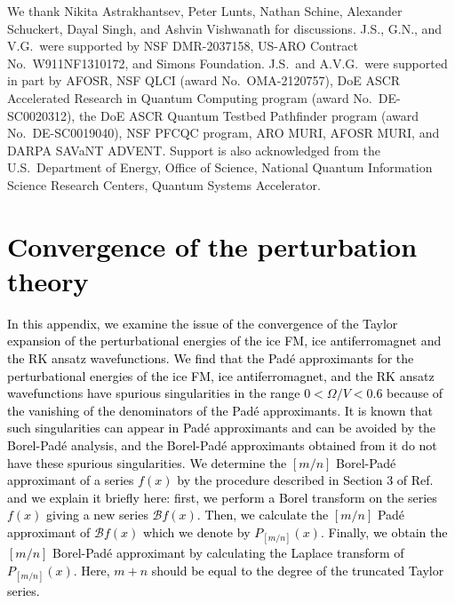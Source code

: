 \documentclass[twocolumn,superscriptaddress,amsmath,amssymb,aps,prx,nofootinbib]{revtex4-2}
\newcommand{\newtext}[1]{\textcolor{black}{#1}}
\begin{document}
\begin{acknowledgments}
We thank Nikita Astrakhantsev, Peter Lunts, Nathan Schine, Alexander Schuckert, Dayal Singh, and Ashvin Vishwanath for discussions. J.S., G.N., and V.G.~were  supported by NSF DMR-2037158, US-ARO Contract No.~W911NF1310172, and Simons Foundation. J.S.~and A.V.G.~were supported in part by AFOSR, NSF QLCI (award No.~OMA-2120757), DoE ASCR Accelerated Research in Quantum Computing program (award No.~DE-SC0020312), the DoE ASCR Quantum Testbed Pathfinder program (award No.~DE-SC0019040), NSF PFCQC program, ARO MURI, AFOSR MURI, and DARPA SAVaNT ADVENT. Support is also acknowledged from the U.S.~Department of Energy, Office of Science, National Quantum Information Science Research Centers, Quantum Systems Accelerator.  

\end{acknowledgments}



\appendix

\section{\newtext{Convergence of the perturbation theory}}\label{app:perturbation}

\newtext{In this appendix, we examine the issue of the convergence of the Taylor expansion of the perturbational energies of the ice FM, ice antiferromagnet and the RK ansatz wavefunctions. 
We find that the Pad\'e approximants for the perturbational energies of the ice FM, ice antiferromagnet, and the RK ansatz wavefunctions  have spurious singularities in the range $0 < \Omega/V < 0.6$ because of the vanishing of the denominators of the Pad\'e approximants. 
It is known that such singularities can appear in Pad\'e approximants and can be avoided by the Borel-Pad\'e analysis, and the Borel-Pad\'e approximants obtained from it do not have these spurious singularities. 
We determine the $[m/n]$ Borel-Pad\'e approximant of a series $f(x)$ by the procedure described in Section 3 of Ref.~\cite{deeb2016comparison} and we explain it briefly here: first, we perform a Borel transform on the series $f(x)$ giving a new series $\mathcal{B}f(x)$. Then, we calculate the $[m/n]$ Pad\'e approximant of $\mathcal{B}f(x)$ which we denote by $P_{[m/n]}(x)$. 
Finally, we obtain the $[m/n]$ Borel-Pad\'e approximant by calculating the Laplace transform of $P_{[m/n]}(x)$.
Here, $m+n$ should be equal to the degree of the truncated Taylor series. }
\end{document}
